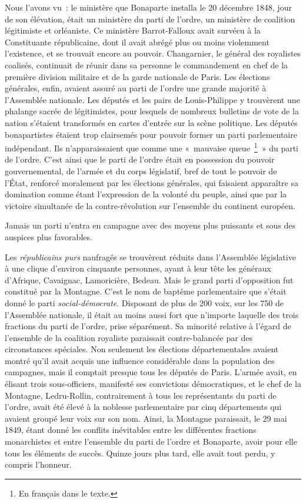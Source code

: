 \documentclass[french,twoside]{book} %
\begin{document}
Nous l’avons vu : le ministère que Bonaparte installa le 20 décembre 1848, jour de son élévation, était un ministère du parti de l’ordre, un ministère de coalition légitimiste et orléaniste. Ce ministère Barrot-Falloux avait survécu à la Constituante républicaine, dont il avait abrégé plus ou moins violemment l’existence, et se trouvait encore au pouvoir. Changarnier, le général des royalistes coalisés, continuait de réunir dans sa personne le commandement en chef de la première division militaire et de la garde nationale de Paris. Les élections générales, enfin, avaient assuré au parti de l’ordre une grande majorité à l’Assemblée nationale. Les députés et les pairs de Louis-Philippe y trouvèrent une phalange sacrée de légitimistes, pour lesquels de nombreux bulletins de vote de la nation s’étaient transformés en cartes d’entrée sur la scène politique. Les députés bonapartistes étaient trop clairsemés pour pouvoir former un parti parlementaire indépendant. Ils n’apparaissaient que comme une « mauvaise queue \footnote{En français dans le texte.} » du parti de l’ordre. C’est ainsi que le parti de l’ordre était en possession du pouvoir gouvernemental, de l’armée et du corps législatif, bref de tout le pouvoir de l’État, renforcé moralement par les élections générales, qui faisaient apparaître sa domination comme étant l’expression de la volonté du peuple, ainsi que par la victoire simultanée de la contre-révolution sur l’ensemble du continent européen.\par
Jamais un parti n’entra en campagne avec des moyens plus puissants et sous des auspices plus favorables.\par
Les \emph{républicains purs} naufragés se trouvèrent réduits dans l’Assemblée législative à une clique d’environ cinquante personnes, ayant à leur tête les généraux d’Afrique, Cavaignac, Lamoricière, Bedeau. Mais le grand parti d’opposition fut constitué par la Montagne. C’est le nom de baptême parlementaire que s’était donné le parti \emph{social-démocrate}. Disposant de plus de 200 voix, sur les 750 de l’Assemblée nationale, il était au moins aussi fort que n’importe laquelle des trois fractions du parti de l’ordre, prise séparément. Sa minorité relative à l’égard de l’ensemble de la coalition royaliste paraissait contre-balancée par des circonstances spéciales. Non seulement les élections départementales avaient montré qu’il avait acquis une influence considérable dans la population des campagnes, mais il comptait presque tous les députés de Paris. L’armée avait, en élisant trois sous-officiers, manifesté ses convictions démocratiques, et le chef de la Montagne, Ledru-Rollin, contrairement à tous les représentants du parti de l’ordre, avait été élevé à la noblesse parlementaire par cinq départements qui avaient groupé leur voix sur son nom. Ainsi, la Montagne paraissait, le 29 mai 1849, étant donné les conflits inévitables entre les différentes fractions monarchistes et entre l’ensemble du parti de l’ordre et Bonaparte, avoir pour elle tous les éléments de succès. Quinze jours plus tard, elle avait tout perdu, y compris l’honneur.\par
\end{document}
